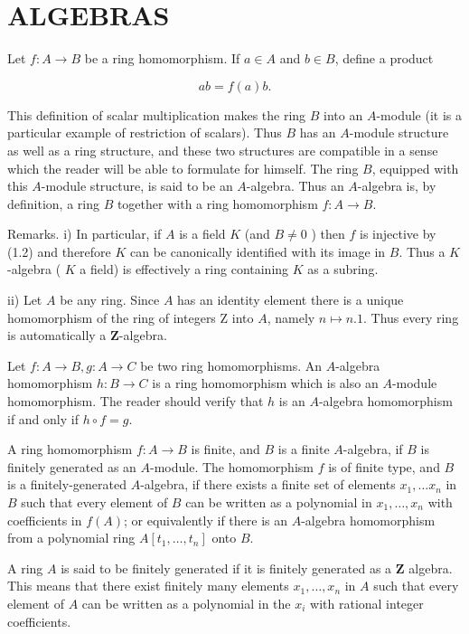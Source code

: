 \documentclass{standalone}
\theoremstyle{definition}
\theoremstyle{remark}
\begin{document}
\section{ALGEBRAS}
Let $f: A \rightarrow B$ be a ring homomorphism. If $a \in A$ and $b \in B$, define a product

\[
a b=f(a) b .
\]

This definition of scalar multiplication makes the ring $B$ into an $A$-module (it is a particular example of restriction of scalars). Thus $B$ has an $A$-module structure as well as a ring structure, and these two structures are compatible in a sense which the reader will be able to formulate for himself. The ring $B$, equipped with this $A$-module structure, is said to be an $A$-algebra. Thus an $A$-algebra is, by definition, a ring $B$ together with a ring homomorphism $f: A \rightarrow B$.

Remarks. i) In particular, if $A$ is a field $K$ (and $B \neq 0$ ) then $f$ is injective by (1.2) and therefore $K$ can be canonically identified with its image in $B$. Thus a $K$-algebra ( $K$ a field) is effectively a ring containing $K$ as a subring.

ii) Let $A$ be any ring. Since $A$ has an identity element there is a unique homomorphism of the ring of integers $\mathrm{Z}$ into $A$, namely $n \mapsto n .1$. Thus every ring is automatically a $\mathbf{Z}$-algebra.

Let $f: A \rightarrow B, g: A \rightarrow C$ be two ring homomorphisms. An $A$-algebra homomorphism $h: B \rightarrow C$ is a ring homomorphism which is also an $A$-module homomorphism. The reader should verify that $h$ is an $A$-algebra homomorphism if and only if $h \circ f=g$.

A ring homomorphism $f: A \rightarrow B$ is finite, and $B$ is a finite $A$-algebra, if $B$ is finitely generated as an $A$-module. The homomorphism $f$ is of finite type, and $B$ is a finitely-generated $A$-algebra, if there exists a finite set of elements $x_{1}, \ldots x_{n}$ in $B$ such that every element of $B$ can be written as a polynomial in $x_{1}, \ldots, x_{n}$ with coefficients in $f(A)$; or equivalently if there is an $A$-algebra homomorphism from a polynomial ring $A\left[t_{1}, \ldots, t_{n}\right]$ onto $B$.

A ring $A$ is said to be finitely generated if it is finitely generated as a $\mathbf{Z}$ algebra. This means that there exist finitely many elements $x_{1}, \ldots, x_{n}$ in $A$ such that every element of $A$ can be written as a polynomial in the $x_{i}$ with rational integer coefficients.
\end{document}
